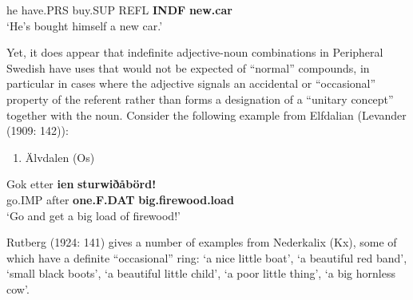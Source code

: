 he  have.PRS  buy.SUP  REFL  \textbf{INDF} \textbf{new.car}\\ %


‘He’s bought himself a new car.’
\z


Yet, it does appear that indefinite adjective-noun combinations in Peripheral Swedish have uses that would not be expected of “normal” compounds, in particular in cases where the adjective signals an accidental or “occasional” property of the referent rather than forms a designation of a “unitary concept” together with the noun. Consider the following example from Elfdalian (Levander (1909: 142)):

\begin{enumerate} %
\item 
Älvdalen (Os)

\end{enumerate} %
\ea\label{}
\gll Gok  etter  \textbf{ien} \textbf{sturwiðåbörd!}\\


go.IMP  after  \textbf{one.F.DAT} \textbf{big.firewood.load}\\ %


‘Go and get a big load of firewood!’ 
\z


Rutberg (1924: 141) gives a number of examples from Nederkalix (Kx), some of which have a definite “occasional” ring: ‘a nice little boat’,  ‘a beautiful red band’,  ‘small black boots’,  ‘a beautiful little child’,  ‘a poor little thing’,  ‘a big hornless cow’.

